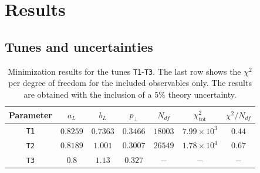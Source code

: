 \documentclass[aps,preprint,floatfix,nofootinbib,showpacs]{revtex4-1}
\begin{document}
\section{Results}
\label{Section4}

\subsection{Tunes and uncertainties}

\begin{table}[!h]
 \begin{center}
  \begin{tabular}{ c | c | c | c | c | c | c }
  \hline \hline
   Parameter   & \hspace{0.8cm} $a_L$  \hspace{0.8cm} & \hspace{0.8cm} $b_L$  \hspace{0.8cm} & \hspace{0.8cm} $p_\perp$ \hspace{0.8cm}  & \hspace{0.8cm} $N_{df}$ & $\chi^2_\textrm{tot}$ & $\chi^2/N_{df}$ \hspace{0.8cm} \\ \hline
   \texttt{T1} & $0.8259$      & $0.7363$  & $0.3466$  & $18003$ & $7.99 \times 10^3$ & $0.44$          \\ \hline
   \texttt{T2} & $0.8189$      & $1.001$  & $0.3007$  &  $26549$ & $1.78 \times 10^4$  &  $0.67$     \\ \hline
   \texttt{T3} & $0.8$         & $1.13$    & $0.327$   & $-$ & $-$  & $-$          \\ \hline \hline
  \end{tabular}
 \end{center}
 \caption{Minimization results for the tunes \texttt{T1}-\texttt{T3}. 
 The last row shows the $\chi^2$ per degree of freedom for the included observables only. The results are obtained with the inclusion of a $5\%$ theory uncertainty.}
 \label{Table.tunes}
\end{table}
\end{document}
